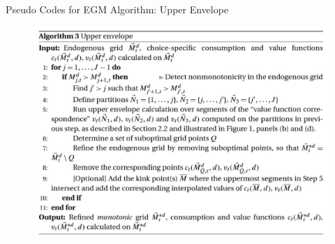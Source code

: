 \documentclass[aspectratio=169]{beamer}
\begin{document}
\begin{frame}{Pseudo Codes for EGM Algorithm: Upper Envelope}
	\label{algo:upperenvelope}
	\begin{figure}
		\includegraphics[scale=0.55]{algorithm3.jpg}
	\end{figure}
	\hyperlink{fig:upperenvelope}{}
\end{frame}
\end{document}
